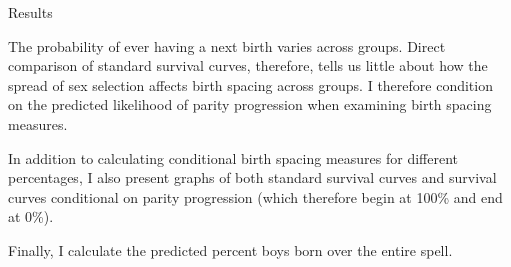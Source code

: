 \documentclass[final]{beamer}
\newlength{\twocolwid}
\begin{document}
\begin{frame}{}
\begin{columns}[t]
\begin{column}{\twocolwid}
\begin{block}{Results}


The probability of ever having a next birth varies across groups.
Direct comparison of standard survival curves, therefore, tells us little 
about how the spread of sex selection affects birth spacing across groups.
I therefore condition on the predicted likelihood of parity 
progression when examining birth spacing measures.

In addition to calculating conditional birth spacing measures for different 
percentages, I also present graphs of both standard survival curves and
survival curves conditional on parity progression (which therefore
begin at 100\% and end at 0\%).

Finally, I calculate the predicted percent boys born over the entire spell.



\end{block}
\end{column}
\end{columns}
\end{frame}
\end{document}
